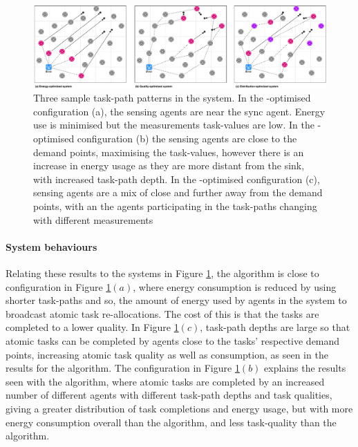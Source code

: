 \begin{figure}
	\centering
	\includegraphics[width=1.0\linewidth]{result-types}
	\caption{Three sample task-path patterns in the \simulationExtended{}{} system. In the \algorithmEnergy{}{}-optimised configuration (a), the sensing agents are near the sync agent. Energy use is minimised but the measurements task-values are low. In the \algorithmQuality{}{}-optimised configuration (b) the sensing agents are close to the demand points, maximising the task-values, however there is an increase in energy usage as they are more distant from the sink, with increased task-path depth. In the \algorithmDistribution{}{}-optimised configuration (c), sensing agents are a mix of close and further away from the demand points, with an the agents participating in the task-paths changing with different measurements}
	\label{fig:result-types}
\end{figure} 

\paragraph{System behaviours}
Relating these results to the systems in Figure \ref{fig:result-types}, the \algorithmEnergy{}{} algorithm is close to configuration in Figure \ref{fig:result-types}$(a)$, where energy consumption is reduced by using shorter task-paths and so, the amount of energy used by agents in the system to broadcast atomic task re-allocations. The cost of this is that the tasks are completed to a lower quality. In Figure \ref{fig:result-types}$(c)$, task-path depths are large so that atomic tasks can be completed by agents close to the tasks' respective demand points, increasing atomic task quality as well as consumption, as seen in the results for the \algorithmQuality{}{} algorithm. The configuration in Figure \ref{fig:result-types}$(b)$ explains the results seen with the \algorithmDistribution{}{} algorithm, where atomic tasks are completed by an increased number of different agents with different task-path depths and task qualities, giving a greater distribution of task completions and energy usage, but with more energy consumption overall than the \algorithmEnergy{}{} algorithm, and less task-quality than the \algorithmQuality{}{} algorithm.


